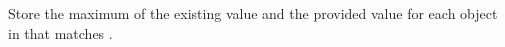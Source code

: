 Store the maximum of the existing value and the provided value for each
object in  that matches .



